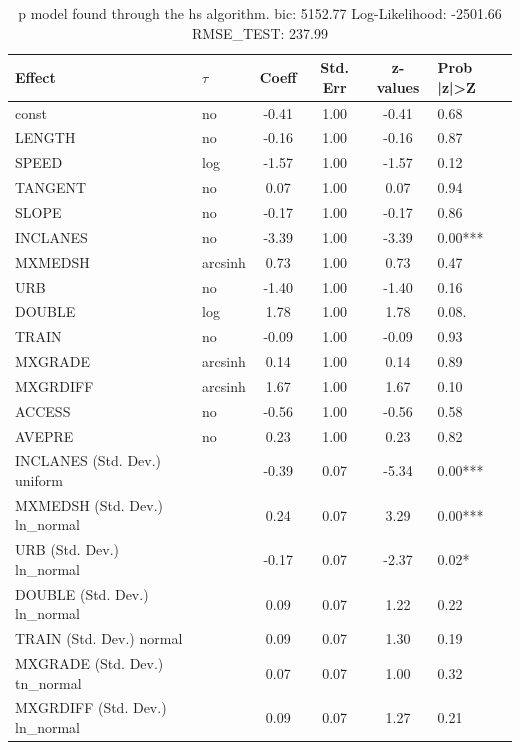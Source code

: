 \begin{table}
	\caption{p model found through the hs algorithm. bic: 5152.77 Log-Likelihood: -2501.66 RMSE_TEST: 237.99}
	\begin{center}
		\begin{tabular}{|l|l|c|c|c|l|}
			\hline
			Effect & $\tau$ & Coeff & Std. Err & z-values & Prob |z|>Z \\
			\hline
			const & no & -0.41 & 1.00 & -0.41 & 0.68 \\
			\hline
			LENGTH & no & -0.16 & 1.00 & -0.16 & 0.87 \\
			\hline
			SPEED & log & -1.57 & 1.00 & -1.57 & 0.12 \\
			\hline
			TANGENT & no & 0.07 & 1.00 & 0.07 & 0.94 \\
			\hline
			SLOPE & no & -0.17 & 1.00 & -0.17 & 0.86 \\
			\hline
			INCLANES & no & -3.39 & 1.00 & -3.39 & 0.00*** \\
			\hline
			MXMEDSH & arcsinh & 0.73 & 1.00 & 0.73 & 0.47 \\
			\hline
			URB & no & -1.40 & 1.00 & -1.40 & 0.16 \\
			\hline
			DOUBLE & log & 1.78 & 1.00 & 1.78 & 0.08. \\
			\hline
			TRAIN & no & -0.09 & 1.00 & -0.09 & 0.93 \\
			\hline
			MXGRADE & arcsinh & 0.14 & 1.00 & 0.14 & 0.89 \\
			\hline
			MXGRDIFF & arcsinh & 1.67 & 1.00 & 1.67 & 0.10 \\
			\hline
			ACCESS & no & -0.56 & 1.00 & -0.56 & 0.58 \\
			\hline
			AVEPRE & no & 0.23 & 1.00 & 0.23 & 0.82 \\
			\hline
			INCLANES (Std. Dev.) uniform &  & -0.39 & 0.07 & -5.34 & 0.00*** \\
			\hline
			MXMEDSH (Std. Dev.) ln_normal &  & 0.24 & 0.07 & 3.29 & 0.00*** \\
			\hline
			URB (Std. Dev.) ln_normal &  & -0.17 & 0.07 & -2.37 & 0.02* \\
			\hline
			DOUBLE (Std. Dev.) ln_normal &  & 0.09 & 0.07 & 1.22 & 0.22 \\
			\hline
			TRAIN (Std. Dev.) normal &  & 0.09 & 0.07 & 1.30 & 0.19 \\
			\hline
			MXGRADE (Std. Dev.) tn_normal &  & 0.07 & 0.07 & 1.00 & 0.32 \\
			\hline
			MXGRDIFF (Std. Dev.) ln_normal &  & 0.09 & 0.07 & 1.27 & 0.21 \\

\end{tabular}
\end{center}
\end{table}
